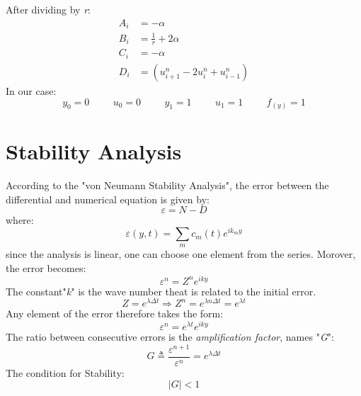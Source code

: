 \documentclass[11pt, a4paper]{article}
\begin{document}
After dividing by \emph{r}:
\begin{align}
    A_i &= - \alpha\\
    B_i &= \frac{1}{r} + 2 \alpha\\
    C_i &= - \alpha\\
    D_i &= \left(u^n_{i+1} - 2u^n_{i} + u^n_{i-1}\right)
\end{align}
In our case:
\begin{equation}
    y_0 = 0 \hspace{1cm}
    u_0 = 0 \hspace{1cm}
    y_1 = 1 \hspace{1cm}
    u_1 = 1 \hspace{1cm}
    f_{(y)} = 1
\end{equation}
\newpage

\section{Stability Analysis}
According to the "von Neumann Stability Analysis", the error between the differential and numerical equation is given by:
\begin{equation}
    \varepsilon = N-D
\end{equation}
where:
\begin{equation}
    \varepsilon(y,t)=\sum_{m}c_m(t)e^{ik_my}
\end{equation}
since the analysis is linear, one can choose one element from the series. Morover, the error becomes:
\begin{equation}
    \varepsilon^n=Z^ne^{iky}
\end{equation}
The constant"\emph{k}" is the wave number theat is related to the initial error.
\begin{equation}
    Z=e^{\lambda\Delta t} \Rightarrow Z^n = e^{\lambda n\Delta t} = e^{\lambda t}
\end{equation}
Any element of the error therefore takes the form:
\begin{equation}
    \varepsilon^n = e^{\lambda  t}e^{iky}
\end{equation}
The ratio between consecutive errors is the \emph{amplification factor}, names "\emph{G}":
\begin{equation}
    G \triangleq \frac{\varepsilon^{n+1}}{\varepsilon^n} = e^{\lambda\Delta t}
\end{equation}
The condition for Stability:
\begin{equation}
    |G| < 1
\end{equation}
\end{document}
